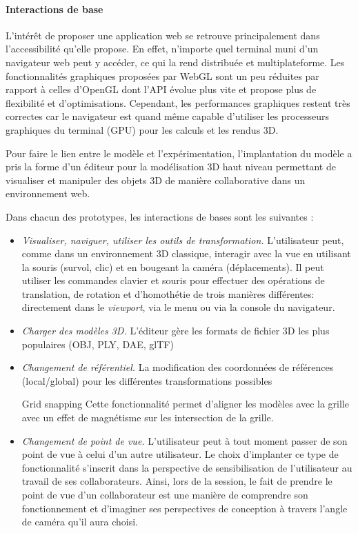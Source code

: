 \paragraph{Interactions de base}
L'intérêt de proposer une application web se retrouve principalement dans 
l'accessibilité qu'elle propose. 
En effet, n'importe quel terminal muni d'un navigateur web peut y accéder, ce qui 
la rend distribuée et multiplateforme. 
Les fonctionnalités graphiques proposées par WebGL sont un peu réduites par 
rapport à celles d'OpenGL dont l'\gls{API} évolue plus vite et propose plus de 
flexibilité et d'optimisations. Cependant, les performances graphiques restent très 
correctes car le navigateur est quand même capable d'utiliser les processeurs 
graphiques du terminal (\gls{GPU}) pour les calculs et les rendus \gls{3D}.

Pour faire le lien entre le modèle et l'expérimentation, l'implantation du modèle a 
pris la forme d'un éditeur pour la modélisation \gls{3D} haut niveau permettant de 
visualiser et manipuler des objets \gls{3D} de manière collaborative dans un 
environnement web.

Dans chacun des prototypes, les interactions de bases sont les suivantes :
\begin{itemize}
	
	\item \textit{Visualiser, naviguer, utiliser les outils de transformation.} 
	L'utilisateur peut, 
	com\-me dans un environnement \gls{3D} classique, interagir avec la vue en 
	utilisant 
	la souris (survol, clic) et en bougeant la caméra (déplacements). Il peut 
	utiliser les commandes clavier et souris pour effectuer des opérations de 
	translation, de rotation et d'homothétie de trois manières différentes: 
	directement dans le \textit{viewport}, via le 
	menu ou via la console du navigateur.
	\item \textit{Charger des modèles \gls{3D}.} L'éditeur gère les formats de 
	fichier 3D les plus populaires (OBJ, PLY, DAE, glTF)
	\item \textit{Changement de référentiel.} La modification des coordonnées de 
	réfé\-ren\-ces (local/global)  pour les différentes transformations possibles
	\item[Grid snapping] Cette fonctionnalité permet d'aligner les modèles avec la 
	grille avec un effet de magnétisme sur les intersection de la grille.
	\item \textit{Changement de point de vue.} L'utilisateur peut à tout moment 
	passer de 
	son point de vue à celui d'un autre utilisateur. Le choix d'implanter ce type de 
	fonctionnalité s'inscrit dans la perspective de sensibilisation de l'utilisateur au 
	travail de ses collaborateurs. Ainsi, lors de la session, le fait de prendre le 
	point de vue d'un collaborateur est une manière de 
	comprendre son fonctionnement et d'imaginer ses 
	perspectives de conception à travers l'angle de caméra qu'il aura choisi.
\end{itemize}

